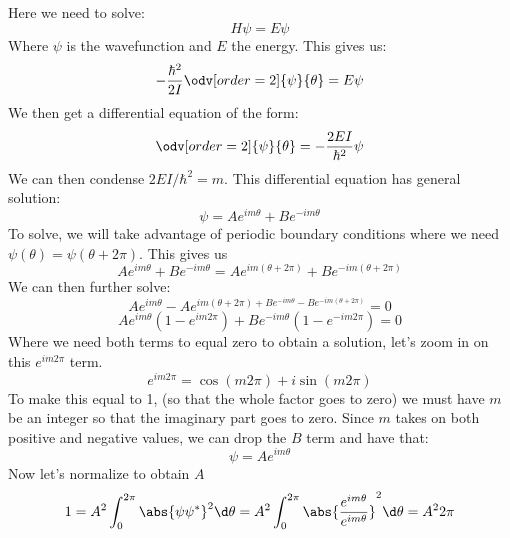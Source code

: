 Here we need to solve:
\begin{equation}
    H\psi = E\psi
\end{equation}
Where $\psi$ is the wavefunction and $E$ the energy. This gives us:
\begin{equation}
    -\frac{\hbar^2}{2I}\odv[order=2]{\psi}{\theta} = E\psi
\end{equation}
We then get a differential equation of the form:
\begin{equation}
    \odv[order=2]{\psi}{\theta} = -\frac{2EI}{\hbar^2}\psi
\end{equation}
We can then condense $2EI/\hbar^2 = m$. This differential equation has general solution:
\begin{equation}
    \psi = Ae^{im\theta} + Be^{-im\theta}
\end{equation}
To solve, we will take advantage of periodic boundary conditions where we need $\psi(\theta) = \psi(\theta + 2\pi)$. This gives us 
\begin{equation}
    Ae^{im\theta} + Be^{-im\theta} = Ae^{im(\theta+2\pi) }+ Be^{-im(\theta+2\pi)}
\end{equation}
We can then further solve:
\begin{equation}
    Ae^{im\theta} - Ae^{im(\theta+2\pi) + Be^{-im\theta} - Be^{-im(\theta+2\pi)}} = 0
\end{equation}
\begin{equation}
    Ae^{im\theta}(1-e^{im2\pi}) + Be^{-im\theta}(1-e^{-im2\pi}) = 0
\end{equation}
Where we need both terms to equal zero to obtain a solution, let's zoom in on this $e^{im2\pi}$ term.
\begin{equation}
    e^{im2\pi} = \cos(m2\pi) + i\sin(m2\pi)
\end{equation}
To make this equal to 1, (so that the whole factor goes to zero) we must have $m$ be an integer so that the imaginary part goes to zero. Since $m$ takes on both positive and negative values, we can drop the $B$ term and have that:
\begin{equation}
    \psi = Ae^{im\theta}
\end{equation}
Now let's normalize to obtain $A$
\begin{equation}
    1 = A^2 \int_{0}^{2\pi}\abs{\psi\psi^*}^2 \d \theta = A^2 \int_{0}^{2\pi}\abs{\frac{e^{im\theta}}{e^{im\theta}}}^2 \d \theta = A^22\pi
\end{equation}
